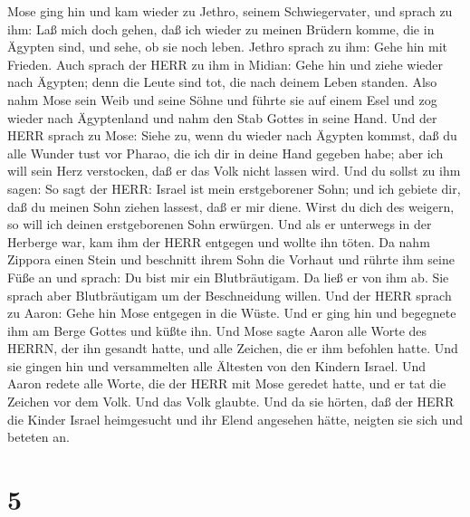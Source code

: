  Mose ging hin und kam wieder zu Jethro, seinem
Schwiegervater, und sprach zu ihm: Laß mich doch gehen, daß ich wieder
zu meinen Brüdern komme, die in Ägypten sind, und sehe, ob sie noch
leben. Jethro sprach zu ihm: Gehe hin mit Frieden.  Auch
sprach der HERR zu ihm in Midian: Gehe hin und ziehe wieder nach
Ägypten; denn die Leute sind tot, die nach deinem Leben standen.
 Also nahm Mose sein Weib und seine Söhne und führte sie
auf einem Esel und zog wieder nach Ägyptenland und nahm den Stab Gottes
in seine Hand.  Und der HERR sprach zu Mose: Siehe zu, wenn
du wieder nach Ägypten kommst, daß du alle Wunder tust vor Pharao, die
ich dir in deine Hand gegeben habe; aber ich will sein Herz verstocken,
daß er das Volk nicht lassen wird.  Und du sollst zu ihm
sagen: So sagt der HERR: Israel ist mein erstgeborener Sohn;
 und ich gebiete dir, daß du meinen Sohn ziehen lassest,
daß er mir diene. Wirst du dich des weigern, so will ich deinen
erstgeborenen Sohn erwürgen.  Und als er unterwegs in der
Herberge war, kam ihm der HERR entgegen und wollte ihn töten.
 Da nahm Zippora einen Stein und beschnitt ihrem Sohn die
Vorhaut und rührte ihm seine Füße an und sprach: Du bist mir ein
Blutbräutigam.  Da ließ er von ihm ab. Sie sprach aber
Blutbräutigam um der Beschneidung willen.  Und der HERR
sprach zu Aaron: Gehe hin Mose entgegen in die Wüste. Und er ging hin
und begegnete ihm am Berge Gottes und küßte ihn.  Und Mose
sagte Aaron alle Worte des HERRN, der ihn gesandt hatte, und alle
Zeichen, die er ihm befohlen hatte.  Und sie gingen hin und
versammelten alle Ältesten von den Kindern Israel.  Und
Aaron redete alle Worte, die der HERR mit Mose geredet hatte, und er tat
die Zeichen vor dem Volk.  Und das Volk glaubte. Und da sie
hörten, daß der HERR die Kinder Israel heimgesucht und ihr Elend
angesehen hätte, neigten sie sich und beteten an.

\hypertarget{section-4}{%
\section{5}\label{section-4}}

